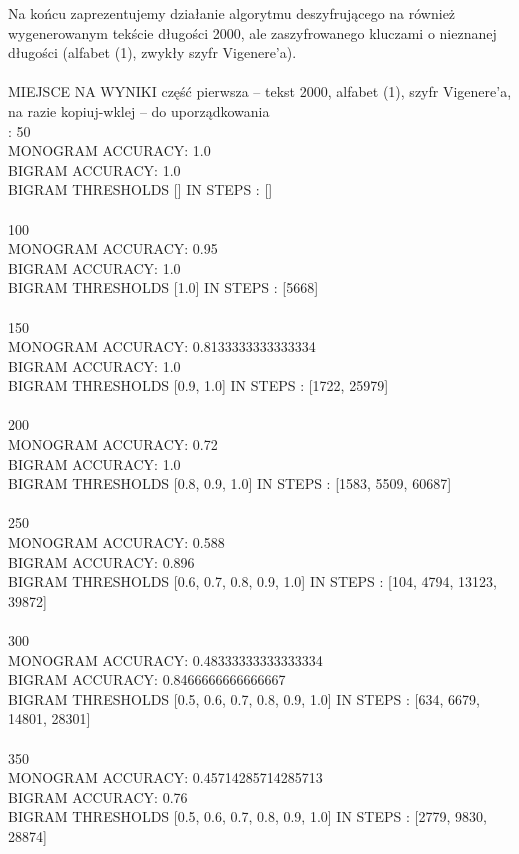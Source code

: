 \documentclass[a4paper]{article}
\begin{document}
Na końcu zaprezentujemy działanie algorytmu deszyfrującego na również wygenerowanym tekście długości 2000, ale zaszyfrowanego kluczami o nieznanej długości (alfabet (1), zwykły szyfr Vigenere'a).
\\\\
MIEJSCE NA WYNIKI
część pierwsza – tekst 2000, alfabet (1), szyfr Vigenere'a, na razie kopiuj-wklej – do uporządkowania\\:
50\\
MONOGRAM ACCURACY: 1.0\\
BIGRAM ACCURACY: 1.0\\
BIGRAM THRESHOLDS [] IN STEPS : []\\\\
100\\
MONOGRAM ACCURACY: 0.95\\
BIGRAM ACCURACY: 1.0\\
BIGRAM THRESHOLDS [1.0] IN STEPS : [5668]\\\\
150\\
MONOGRAM ACCURACY: 0.8133333333333334\\
BIGRAM ACCURACY: 1.0\\
BIGRAM THRESHOLDS [0.9, 1.0] IN STEPS : [1722, 25979]\\\\
200\\
MONOGRAM ACCURACY: 0.72\\
BIGRAM ACCURACY: 1.0\\
BIGRAM THRESHOLDS [0.8, 0.9, 1.0] IN STEPS : [1583, 5509, 60687]\\\\
250\\
MONOGRAM ACCURACY: 0.588\\
BIGRAM ACCURACY: 0.896\\
BIGRAM THRESHOLDS [0.6, 0.7, 0.8, 0.9, 1.0] IN STEPS : [104, 4794, 13123, 39872]\\\\
300\\
MONOGRAM ACCURACY: 0.48333333333333334\\
BIGRAM ACCURACY: 0.8466666666666667\\
BIGRAM THRESHOLDS [0.5, 0.6, 0.7, 0.8, 0.9, 1.0] IN STEPS : [634, 6679, 14801, 28301]\\\\
350\\
MONOGRAM ACCURACY: 0.45714285714285713\\
BIGRAM ACCURACY: 0.76\\
BIGRAM THRESHOLDS [0.5, 0.6, 0.7, 0.8, 0.9, 1.0] IN STEPS : [2779, 9830, 28874]\\\\
\end{document}

